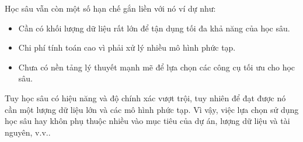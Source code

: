 Học sâu vẫn còn một số hạn chế gắn liền với nó ví dự như:
\begin{itemize}
    \item Cần có khối lượng dữ liệu rất lớn để tận dụng tối đa khả năng của học sâu.
    \item Chi phí tính toán cao vì phải xử lý nhiều mô hình phức tạp.
    \item Chưa có nền tảng lý thuyết mạnh mẽ để lựa chọn các công cụ tối ưu cho học sâu.
\end{itemize}

Tuy học sâu có hiệu năng và độ chính xác vượt trội, tuy nhiên để đạt được nó cần một lượng dữ liệu lớn và các mô hình phức tạp. Vì vậy, việc lựa chọn sử dụng học sâu hay khôn phụ thuộc nhiều vào mục tiêu của dự án, lượng dữ liệu và tài nguyên, v.v..\cite{webpage10}
